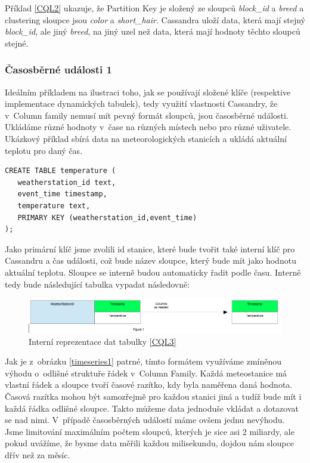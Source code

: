 Příklad \ref{CQL2} ukazuje, že Partition Key je složený ze sloupců \emph{block\_id} a  \emph{breed} a clustering sloupce jsou \emph{color} a \emph{short\_hair}. Cassandra uloží data, která mají stejný \emph{block\_id}, ale jiný \emph{breed}, na jiný uzel než data, která mají hodnoty těchto sloupců stejné.  


\subsubsection*{Časosběrné události 1}
Ideálním příkladem na ilustraci toho, jak se používají složené klíče (respektive implementace dynamických tabulek), tedy využití vlastnosti Cassandry, že v~Column family nemusí mít pevný formát sloupců, jsou časosběrné události. Ukládáme různé hodnoty v~čase na různých místech nebo pro různé uživatele. Ukázkový příklad sbírá data na meteorologických stanicích a ukládá aktuální teplotu pro daný čas.

\begin{lstlisting}[caption={Dynamická tabulka 1},label=CQL3]
CREATE TABLE temperature (
   weatherstation_id text,
   event_time timestamp,
   temperature text,
   PRIMARY KEY (weatherstation_id,event_time)
);
\end{lstlisting}

Jako primární klíč jsme zvolili id stanice, které bude tvořit také interní klíč pro Cassandru a čas události, což bude název sloupce, který bude mít jako hodnotu aktuální teplotu. Sloupce se interně budou automaticky řadit podle času. Interně tedy bude následující tabulka vypadat následovně: 

\begin{figure}[h]
\centering
\includegraphics[scale=0.4]{images/timeseries1}
\caption{Interní reprezentace dat tabulky \ref{CQL3}}
\label{fig:timeseries1}
\end{figure}

Jak je z~obrázku \ref{timeseries1} patrné, tímto formátem využíváme zmíněnou výhodu o~odlišné struktuře řádek v~Column Family. Každá meteostanice má vlastní řádek a sloupce tvoří časové razítko, kdy byla naměřena daná hodnota. Časová razítka mohou být samozřejmě pro každou stanici jiná a tudíž bude mít i každá řádka odlišné sloupce. Takto můžeme data jednoduše vkládat a dotazovat se nad nimi. V~případě časosběrných událostí máme ovšem jednu nevýhodu. Jsme limitování maximálním počtem sloupců, kterých je sice asi 2 miliardy, ale pokud uvážíme, že bysme data měřili každou milisekundu, dojdou nám sloupce dřív než za měsíc.  

